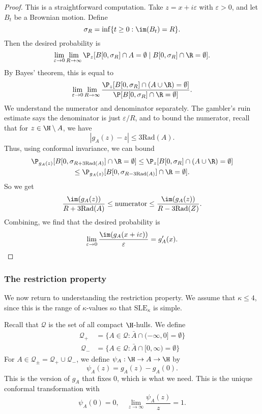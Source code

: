 \documentclass[a4paper]{article}
\newcommand\SLE{\mathrm{SLE}}
\newcommand\rad{\mathrm{Rad}}
\begin{document}
\begin{proof}
  This is a straightforward computation. Take $z = x + i \varepsilon$ with $\varepsilon > 0$, and let $B_t$ be a Brownian motion. Define
  \[
    \sigma_R = \inf \{t \geq 0: \im(B_t) = R\}.
  \]
  Then the desired probability is
  \[
    \lim_{\varepsilon \to 0} \lim_{R \to \infty} \P_z [B[0, \sigma_R] \cap A = \emptyset \mid B[0, \sigma_R] \cap \R = \emptyset].
  \]
  By Bayes' theorem, this is equal to
  \[
    \lim_{\varepsilon \to 0}\lim_{R \to \infty} \frac{\P_z[B[0, \sigma_R] \cap (A \cup \R) = \emptyset]}{\P[B[0, \sigma_R] \cap \R = \emptyset]}.
  \]
  We understand the numerator and denominator separately. The gambler's ruin estimate says the denominator is just $\varepsilon/R$, and to bound the numerator, recall that for $z \in \H \setminus A$, we have
  \[
    |g_A(z) - z| \leq 3 \rad(A).
  \]
  Thus, using conformal invariance, we can bound
  \begin{multline*}
    \P_{g_A(z)} [B[0, \sigma_{R + 3\rad(A)}] \cap \R = \emptyset] \leq \P_z[B[0, \sigma_R] \cap (A \cup \R) = \emptyset]\\
    \leq \P_{g_A(z)}[B[0, \sigma_{R - 3 \rad(A)}] \cap \R = \emptyset].
  \end{multline*}
  So we get
  \[
    \frac{\im(g_A(z))}{R+ 3 \rad(A)} \leq \text{numerator} \leq \frac{\im(g_A(z))}{R - 3 \rad(Z)}.
  \]
  Combining, we find that the desired probability is
  \[
    \lim_{\varepsilon \to 0} \frac{\im(g_A(x + i \varepsilon))}{\varepsilon} = g_A'(x).\qedhere
  \]
\end{proof}

\subsubsection*{The restriction property}
We now return to understanding the restriction property. We assume that $\kappa \leq 4$, since this is the range of $\kappa$-values so that $\SLE_\kappa$ is simple.

Recall that $\mathcal{Q}$ is the set of all compact $\H$-hulls. We define
\begin{align*}
  \mathcal{Q}_+ &= \{A \in \mathcal{Q} : \bar{A} \cap (-\infty, 0] = \emptyset\}\\\
  \mathcal{Q}_- &= \{A \in \mathcal{Q} : \bar{A} \cap [0, \infty) = \emptyset\}
\end{align*}
For $A \in \mathcal{Q}_{\pm} = \mathcal{Q}_+ \cup \mathcal{Q}_-$, we define $\psi_A: \H \to A \to \H$ by
\[
  \psi_A(z) = g_A(z) - g_A(0).
\]
This is the version of $g_A$ that fixes $0$, which is what we need. This is the unique conformal transformation with
\[
  \psi_A(0) = 0,\quad \lim_{z \to \infty} \frac{\psi_A(z)}{z} = 1.
\]
\end{document}
